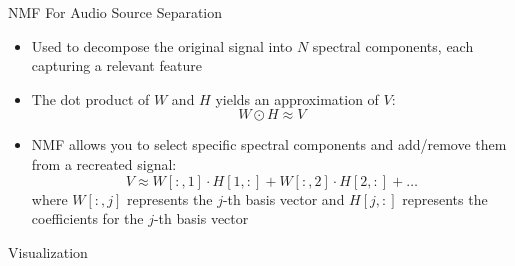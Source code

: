 \documentclass{if-beamer}
\begin{document}
\begin{frame}{NMF For Audio Source Separation}
\begin{itemize}
    \item Used to decompose the original signal into $N$ spectral components, each capturing a relevant feature
    \item The dot product of \( W \) and \( H \) yields an approximation of \( V \):
    \[
    W \odot H \approx V
    \]
    \item NMF allows you to select specific spectral components and add/remove them from a recreated signal:
    \[
    V \approx W[:, 1] \cdot H[1, :] + W[:, 2] \cdot H[2, :] + \ldots
    \]
    where \( W[:, j] \) represents the \( j \)-th basis vector and \( H[j, :] \) represents the coefficients for the \( j \)-th basis vector
\end{itemize}
\end{frame}

\begin{frame}{Visualization}
\begin{figure}[h]
    \centering
    \hspace{0.05\textwidth}
    
\end{figure}
\end{frame}
\end{document}
